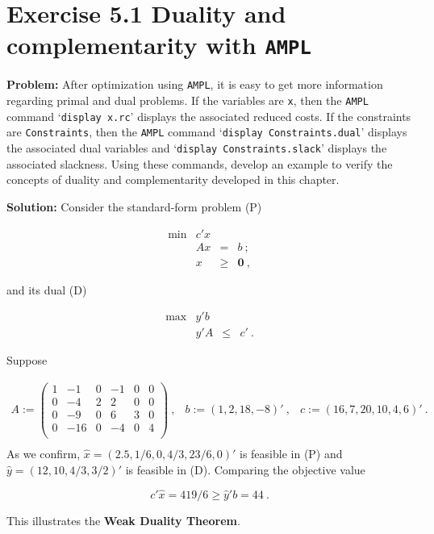 \section{Exercise 5.1 Duality and complementarity with {\tt AMPL}}
\textbf{Problem:} After optimization using {\tt AMPL}, it is easy to get more information regarding primal and dual problems. If the variables are {\tt x}, then the {\tt AMPL} command `{\tt display x.rc}' displays the associated reduced costs. If the constraints are {\tt Constraints}, then the {\tt AMPL} command `{\tt display Constraints.dual}' displays the associated dual variables and `{\tt display Constraints.slack}' displays the associated slackness. Using these commands, develop an example to verify the concepts of duality and complementarity developed in this chapter.

\textbf{Solution:} Consider the standard-form problem (P) 

\[
\tag{P}
\begin{array}{rrcl}
 \min & c'x  &      &   \\
      &  Ax  &   =  & b~; \\
      &   x  & \geq & \mathbf{0}~,
\end{array}
\]

and its dual (D)

\[
\begin{array}{rrcl}
 \max & y'b  &      &   \\
      &  y'A  &   \leq  & c'~.
\end{array}
\tag{D}
\]

Suppose

\[
\begin{array}{ccc}
A  :=  \left(
  \begin{array}{cccccc}
    1 & -1 & 0 & -1 & 0 & 0 \\
    0 & -4 & 2 & 2 & 0 & 0 \\
    0 & -9 & 0 & 6 & 3 & 0 \\
    0 & -16 & 0 & -4 & 0 & 4 \\
  \end{array}
\right)~, &
b  :=  (1,2,18,-8)'~, &
c  :=  (16, 7, 20, 10, 4, 6)'~.\\
\end{array}
\]
As we confirm, $\hat{x} = (2.5,1/6,0,4/3,23/6,0)'$ is feasible in (P) and $\hat{y} = (12,10,4/3,3/2)'$ is feasible in (D). Comparing the objective value

$$c'\hat{x} = 419/6 \geq \hat{y}'b = 44~.$$

This illustrates the \textbf{Weak Duality Theorem}.

